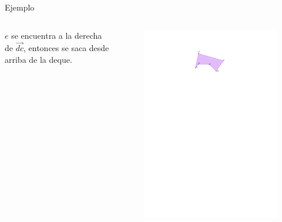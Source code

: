 \documentclass[aspectratio=169,xcolor=dvipsnames, t]{beamer}
\begin{document}
\begin{frame}{Ejemplo}
  \begin{columns}
    \begin{column}{0.5\textwidth}
      $e$ se encuentra a la derecha de $\overrightarrow{dc}$, entonces se saca desde arriba de la deque.
    \end{column}
    \begin{column}{0.5\textwidth}
      \begin{figure}
        \centering
        \includegraphics[width=\linewidth, height=0.5\textheight, page=8, keepaspectratio]{IPE/Melkman.pdf}
      \end{figure}
    \end{column}
  \end{columns}
\end{frame}
\end{document}

